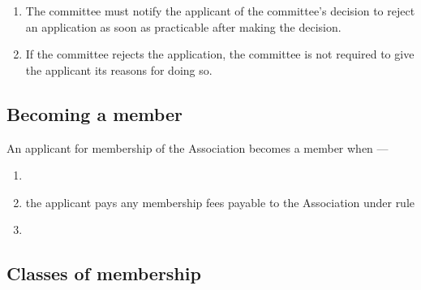 \documentclass[../constitution.tex]{subfiles}
\begin{document}
\begin{enumerate}
\item The committee must notify the applicant of the committee's decision to  reject an application as soon as practicable after making the decision.

\item If the committee rejects the application, the committee is not required to give the applicant its reasons for doing so.
\end{enumerate}



\subsection{Becoming a member} \label{becoming-a-member}


An applicant for membership of the Association becomes a member when ---

\begin{enumerate}
\def\labelenumi{\alph{enumi})}
\setcounter{enumi}{0}
\item {}
\item the applicant pays any membership fees payable to the Association under rule \chreplaced[id=proofing]{\ref{membership-fees}}{\ref{member-must-pay-fee}}
\item {}
\end{enumerate}



\subsection{Classes of membership} \label{classes-of-membership}
\end{document}
